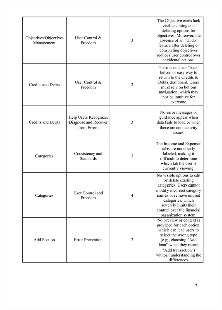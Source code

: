 \documentclass[a4paper,12pt]{article}
\begin{document}
\begin{figure}[H]
    \centering
    \includegraphics[width=1\linewidth]{HE2.pdf}
\end{figure}
\end{document}
